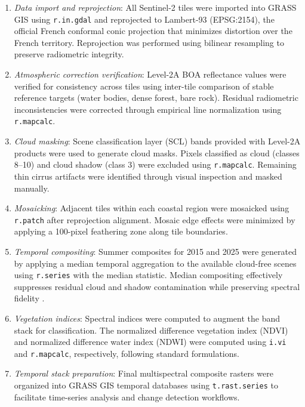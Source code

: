 \documentclass[remotesensing,article,submit,pdftex,moreauthors]{Definitions/mdpi}
\begin{document}
\begin{enumerate}
\item \textit{Data import and reprojection}: All Sentinel-2 tiles were imported into GRASS GIS using \texttt{r.in.gdal} and reprojected to Lambert-93 (EPSG:2154), the official French conformal conic projection that minimizes distortion over the French territory. Reprojection was performed using bilinear resampling to preserve radiometric integrity.

\item \textit{Atmospheric correction verification}: Level-2A BOA reflectance values were verified for consistency across tiles using inter-tile comparison of stable reference targets (water bodies, dense forest, bare rock). Residual radiometric inconsistencies were corrected through empirical line normalization using \texttt{r.mapcalc}.

\item \textit{Cloud masking}: Scene classification layer (SCL) bands provided with Level-2A products were used to generate cloud masks. Pixels classified as cloud (classes 8--10) and cloud shadow (class 3) were excluded using \texttt{r.mapcalc}. Remaining thin cirrus artifacts were identified through visual inspection and masked manually.

\item \textit{Mosaicking}: Adjacent tiles within each coastal region were mosaicked using \texttt{r.patch} after reprojection alignment. Mosaic edge effects were minimized by applying a 100-pixel feathering zone along tile boundaries.

\item \textit{Temporal compositing}: Summer composites for 2015 and 2025 were generated by applying a median temporal aggregation to the available cloud-free scenes using \texttt{r.series} with the median statistic. Median compositing effectively suppresses residual cloud and shadow contamination while preserving spectral fidelity \citep{RF_Czechia2022}.

\item \textit{Vegetation indices}: Spectral indices were computed to augment the band stack for classification. The normalized difference vegetation index (NDVI) and normalized difference water index (NDWI) were computed using \texttt{i.vi} and \texttt{r.mapcalc}, respectively, following standard formulations.

\item \textit{Temporal stack preparation}: Final multispectral composite rasters were organized into GRASS GIS temporal databases using \texttt{t.rast.series} to facilitate time-series analysis and change detection workflows.
\end{enumerate}
\end{document}
